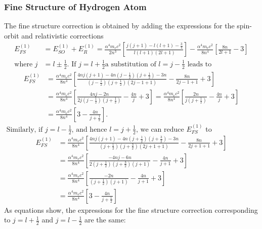 \subsubsection{Fine Structure of Hydrogen Atom}
The fine structure correction is obtained by adding the expressions for the spin-orbit and relativistic corrections
$$
\begin{aligned}
E_{F S}^{(1)}&=E_{S O}^{(1)}+E_{R}^{(1)}=\frac{\alpha^{4} m_{e} c^{2}}{2 n^{3}}\left[\frac{j(j+1)-l(l+1)-\frac{3}{4}}{l(l+1)(2 l+1)}\right]-\frac{\alpha^{4} m_{e} c^{2}}{8 n^{4}}\left[\frac{8 n}{2 l+1}-3\right]\\
\text{where }j&=l \pm \frac{1}{2} .\text{ If }j=l+\frac{1}{2} \text{a substitution of }l=j-\frac{1}{2}\text{  leads to}
\end{aligned}
$$
$$\begin{aligned}
	E_{F S}^{(1)} &=\frac{\alpha^{4} m_{e} c^{2}}{8 n^{4}}\left[\frac{4 n j(j+1)-4 n\left(j-\frac{1}{2}\right)\left(j+\frac{1}{2}\right)-3 n}{\left(j-\frac{1}{2}\right)\left(j+\frac{1}{2}\right)(2 j-1+1)}-\frac{8 n}{2 j-1+1}+3\right] \\
	&=\frac{\alpha^{4} m_{e} c^{2}}{8 n^{4}}\left[\frac{4 n j-2 n}{2 j\left(j-\frac{1}{2}\right)\left(j+\frac{1}{2}\right)}-\frac{4 n}{j}+3\right]=\frac{\alpha^{4} m_{e} c^{2}}{8 n^{4}}\left[\frac{2 n}{j\left(j+\frac{1}{2}\right)}-\frac{4 n}{j}+3\right] \\
	&=\frac{\alpha^{4} m_{e} c^{2}}{8 n^{4}}\left[3-\frac{4 n}{j+\frac{1}{2}}\right] .
\end{aligned}$$
$\text { Similarly, if } j=l-\frac{1}{2} \text {, and hence } l=j+\frac{1}{2} \text {, we can reduce } E_{F S}^{(1)}$ to\\
$$\begin{aligned}
	E_{F S}^{(1)} &=\frac{\alpha^{4} m_{e} c^{2}}{8 n^{4}}\left[\frac{4 n j(j+1)-4 n\left(j+\frac{1}{2}\right)\left(j+\frac{3}{2}\right)-3 n}{\left(j+\frac{1}{2}\right)\left(j+\frac{3}{2}\right)(2 j+1+1)}-\frac{8 n}{2 j+1+1}+3\right] \\
	&=\frac{\alpha^{4} m_{e} c^{2}}{8 n^{4}}\left[\frac{-4 n j-6 n}{2\left(j+\frac{1}{2}\right)\left(j+\frac{3}{2}\right)(j+1)}-\frac{4 n}{j+1}+3\right] \\
	&=\frac{\alpha^{4} m_{e} c^{2}}{8 n^{4}}\left[\frac{-2 n}{\left(j+\frac{1}{2}\right)(j+1)}-\frac{4 n}{j+1}+3\right] \\
	&=\frac{\alpha^{4} m_{e} c^{2}}{8 n^{4}}\left[3-\frac{4 n}{j+\frac{1}{2}}\right]
\end{aligned}$$
As equations show, the expressions for the fine structure correction corresponding to $j=l+\frac{1}{2}$ and $j=l-\frac{1}{2}$ are the same:
